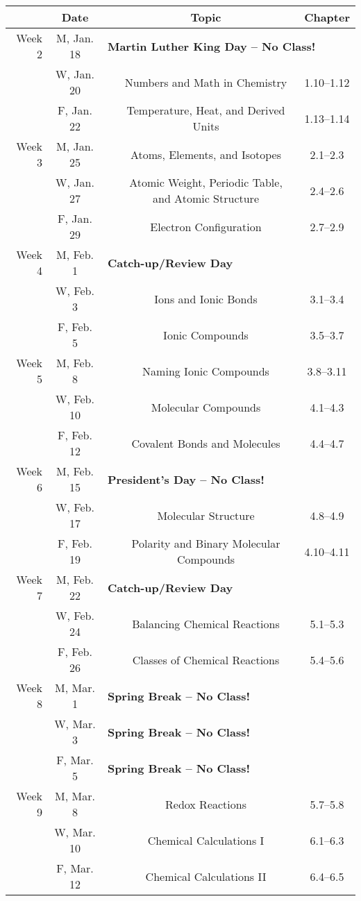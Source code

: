 \documentclass[12pt, letterpaper]{article}
\begin{document}
\noindent
\begin{tabular}{rcccc}
	& Date && Topic & Chapter\\
	\midrule
	Week 2 & M, Jan. 18& \multicolumn{3}{l}{\textbf{Martin Luther King Day -- No Class!}}\\
	& W, Jan. 20&& Numbers and Math in Chemistry & 1.10--1.12\\
	& F, Jan. 22&& Temperature, Heat, and Derived Units & 1.13--1.14\\
	\midrule
	Week 3 & M, Jan. 25&& Atoms, Elements, and Isotopes & 2.1--2.3\\
	& W, Jan. 27&& Atomic Weight, Periodic Table, and Atomic Structure & 2.4--2.6\\
	& F, Jan. 29&& Electron Configuration & 2.7--2.9\\
	\midrule
	Week 4 & M, Feb. 1& \multicolumn{3}{l}{\textbf{Catch-up/Review Day}}\\
	& W, Feb. 3&& Ions and Ionic Bonds & 3.1--3.4\\
	& F, Feb. 5&& Ionic Compounds & 3.5--3.7\\
	\midrule
	Week 5 & M, Feb. 8&& Naming Ionic Compounds & 3.8--3.11\\
	& W, Feb. 10&& Molecular Compounds & 4.1--4.3\\
	& F, Feb. 12&& Covalent Bonds and Molecules & 4.4--4.7\\
	\midrule
	Week 6 & M, Feb. 15& \multicolumn{3}{l}{\textbf{President's Day -- No Class!}}\\
	& W, Feb. 17&& Molecular Structure & 4.8--4.9\\
	& F, Feb. 19&& Polarity and Binary Molecular Compounds & 4.10--4.11\\
	\midrule
	Week 7 & M, Feb. 22& \multicolumn{3}{l}{\textbf{Catch-up/Review Day}}\\
	& W, Feb. 24&& Balancing Chemical Reactions & 5.1--5.3\\
	& F, Feb. 26&& Classes of Chemical Reactions & 5.4--5.6\\
	\midrule
	Week 8 & M, Mar. 1& \multicolumn{3}{l}{\textbf{Spring Break -- No Class!}}\\
	& W, Mar. 3& \multicolumn{3}{l}{\textbf{Spring Break -- No Class!}}\\
	& F, Mar. 5& \multicolumn{3}{l}{\textbf{Spring Break -- No Class!}}\\
	\midrule
	Week 9 & M, Mar. 8&& Redox Reactions & 5.7--5.8\\
	& W, Mar. 10&& Chemical Calculations I & 6.1--6.3\\
	& F, Mar. 12&& Chemical Calculations II & 6.4--6.5\\
\end{tabular}
\end{document}
